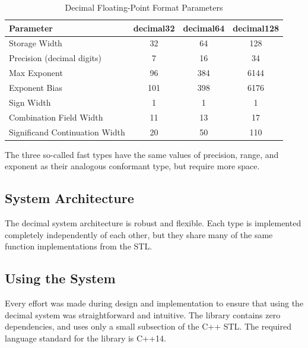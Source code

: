 \documentclass[acmsmall]{acmart}
\begin{document}
\begin{table}[H]
\centering
\begin{tabular}{|l|c|c|c|}
\hline
\textbf{Parameter} & \textbf{decimal32} & \textbf{decimal64} & \textbf{decimal128} \\
\hline
Storage Width & 32 & 64 & 128 \\
\hline
Precision (decimal digits) & 7 & 16 & 34 \\
\hline
Max Exponent & 96 & 384 & 6144 \\
\hline
Exponent Bias & 101 & 398 & 6176 \\
\hline
Sign Width & 1 & 1 & 1 \\
\hline
Combination Field Width & 11 & 13 & 17 \\
\hline
Significand Continuation Width & 20 & 50 & 110 \\
\hline
\end{tabular}
\caption{Decimal Floating-Point Format Parameters}
\label{tab:decimal_params}
\end{table}

The three so-called fast types have the same values of precision, range, and exponent as their analogous conformant type, but require more space.

\subsection{System Architecture}

The decimal system architecture is robust and flexible.
Each type is implemented completely independently of each other, but they share many of the same function implementations from the STL.

\subsection{Using the System}

Every effort was made during design and implementation to ensure that using the decimal system was straightforward and intuitive.
The library contains zero dependencies, and uses only a small subsection of the C++ STL.
The required language standard for the library is C++14.
\end{document}
